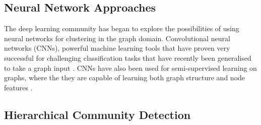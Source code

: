 \documentclass{report}
\begin{document}
	
	
	\subsection{Neural Network Approaches}
	The deep learning community has began to explore the possibilities of using neural networks for clustering in the graph domain. Convolutional neural networks (CNNs), powerful machine learning tools that have proven very successful for challenging classification tasks that have recently been generalised to take a graph input \cite{defferrard2016convolutional}. 
	CNNs have also been used for semi-supervised learning on graphs, where the they are capable of learning both graph structure and node features \cite{kipf2016semi}. 
	
	\subsection{Hierarchical Community Detection}
	
\end{document}
